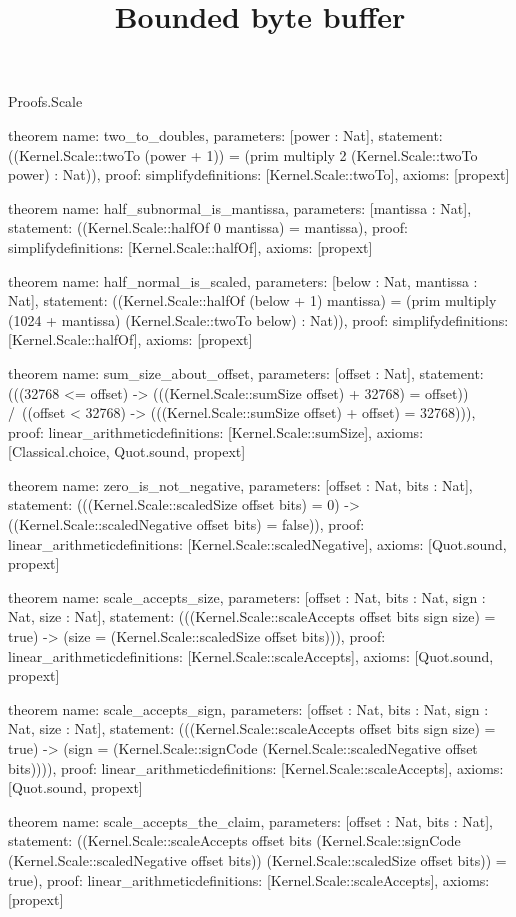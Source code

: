 \begin{lexlean}{Proofs.Scale}
\title{Bounded byte buffer}
\begin{semanticmodule}
theorem{
  name: two_to_doubles,
  parameters: [power : Nat],
  statement: ((Kernel.Scale::twoTo (power + 1)) = (prim multiply 2 (Kernel.Scale::twoTo power) : Nat)),
  proof: simplify{definitions: [Kernel.Scale::twoTo]},
  axioms: [propext]
}

theorem{
  name: half_subnormal_is_mantissa,
  parameters: [mantissa : Nat],
  statement: ((Kernel.Scale::halfOf 0 mantissa) = mantissa),
  proof: simplify{definitions: [Kernel.Scale::halfOf]},
  axioms: [propext]
}

theorem{
  name: half_normal_is_scaled,
  parameters: [below : Nat, mantissa : Nat],
  statement: ((Kernel.Scale::halfOf (below + 1) mantissa) = (prim multiply (1024 + mantissa) (Kernel.Scale::twoTo below) : Nat)),
  proof: simplify{definitions: [Kernel.Scale::halfOf]},
  axioms: [propext]
}

theorem{
  name: sum_size_about_offset,
  parameters: [offset : Nat],
  statement: (((32768 <= offset) -> (((Kernel.Scale::sumSize offset) + 32768) = offset)) /\ ((offset < 32768) -> (((Kernel.Scale::sumSize offset) + offset) = 32768))),
  proof: linear_arithmetic{definitions: [Kernel.Scale::sumSize]},
  axioms: [Classical.choice, Quot.sound, propext]
}

theorem{
  name: zero_is_not_negative,
  parameters: [offset : Nat, bits : Nat],
  statement: (((Kernel.Scale::scaledSize offset bits) = 0) -> ((Kernel.Scale::scaledNegative offset bits) = false)),
  proof: linear_arithmetic{definitions: [Kernel.Scale::scaledNegative]},
  axioms: [Quot.sound, propext]
}

theorem{
  name: scale_accepts_size,
  parameters: [offset : Nat, bits : Nat, sign : Nat, size : Nat],
  statement: (((Kernel.Scale::scaleAccepts offset bits sign size) = true) -> (size = (Kernel.Scale::scaledSize offset bits))),
  proof: linear_arithmetic{definitions: [Kernel.Scale::scaleAccepts]},
  axioms: [Quot.sound, propext]
}

theorem{
  name: scale_accepts_sign,
  parameters: [offset : Nat, bits : Nat, sign : Nat, size : Nat],
  statement: (((Kernel.Scale::scaleAccepts offset bits sign size) = true) -> (sign = (Kernel.Scale::signCode (Kernel.Scale::scaledNegative offset bits)))),
  proof: linear_arithmetic{definitions: [Kernel.Scale::scaleAccepts]},
  axioms: [Quot.sound, propext]
}

theorem{
  name: scale_accepts_the_claim,
  parameters: [offset : Nat, bits : Nat],
  statement: ((Kernel.Scale::scaleAccepts offset bits (Kernel.Scale::signCode (Kernel.Scale::scaledNegative offset bits)) (Kernel.Scale::scaledSize offset bits)) = true),
  proof: linear_arithmetic{definitions: [Kernel.Scale::scaleAccepts]},
  axioms: [propext]
}
\end{semanticmodule}
\end{lexlean}
